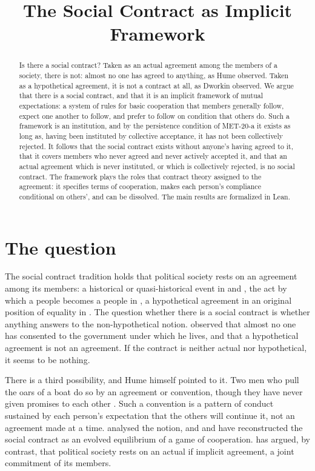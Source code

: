 \documentclass{situationist-preprint}
\title{The Social Contract as Implicit Framework}
\begin{document}
\maketitle

\begin{abstract}
Is there a social contract? Taken as an actual agreement among the members of a society, there is not: almost no one has agreed to anything, as Hume observed. Taken as a hypothetical agreement, it is not a contract at all, as Dworkin observed. We argue that there is a social contract, and that it is an implicit framework of mutual expectations: a system of rules for basic cooperation that members generally follow, expect one another to follow, and prefer to follow on condition that others do. Such a framework is an institution, and by the persistence condition of MET-20-a it exists as long as, having been instituted by collective acceptance, it has not been collectively rejected. It follows that the social contract exists without anyone's having agreed to it, that it covers members who never agreed and never actively accepted it, and that an actual agreement which is never instituted, or which is collectively rejected, is no social contract. The framework plays the roles that contract theory assigned to the agreement: it specifies terms of cooperation, makes each person's compliance conditional on others', and can be dissolved. The main results are formalized in Lean.
\end{abstract}

\section{The question}

The social contract tradition holds that political society rests on an agreement among its members: a historical or quasi-historical event in \citet{Hobbes1651} and \citet{Locke1689}, the act by which a people becomes a people in \citet{Rousseau1762}, a hypothetical agreement in an original position of equality in \citet{Rawls1971}. The question whether there is a social contract is whether anything answers to the non-hypothetical notion. \citet{Hume1748} observed that almost no one has consented to the government under which he lives, and \citet{Dworkin1973} that a hypothetical agreement is not an agreement. If the contract is neither actual nor hypothetical, it seems to be nothing.

There is a third possibility, and Hume himself pointed to it. Two men who pull the oars of a boat do so by an agreement or convention, though they have never given promises to each other \citep[3.2.2]{Hume1739}. Such a convention is a pattern of conduct sustained by each person's expectation that the others will continue it, not an agreement made at a time. \citet{Lewis1969} analysed the notion, and \citet{Skyrms1996} and \citet{Binmore2005} have reconstructed the social contract as an evolved equilibrium of a game of cooperation. \citet{Gilbert2006} has argued, by contrast, that political society rests on an actual if implicit agreement, a joint commitment of its members.
\end{document}

